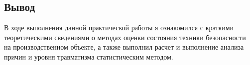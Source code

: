 \documentclass[a5paper, 12dd, twoside]{article}
\begin{document}


\subsection*{Вывод}
В ходе выполнения данной практической работы я ознакомился с краткими теоретическими сведениями о методах оценки состояния техники безопасности на производственном объекте, а также выполнил расчет и выполнение анализа причин и уровня травматизма статистическим методом.
\end{document}
